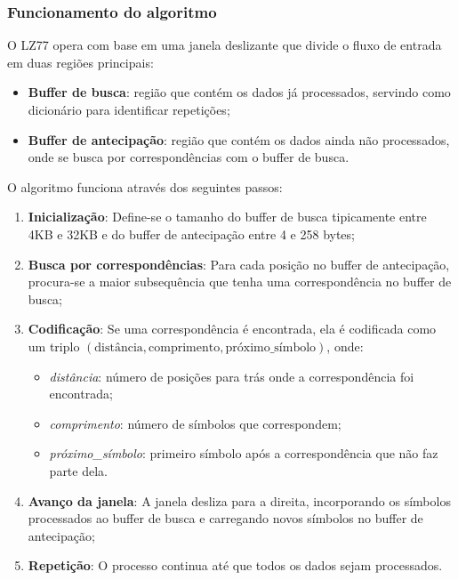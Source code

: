 \subsubsection{Funcionamento do algoritmo}

O LZ77 opera com base em uma janela deslizante que divide o fluxo de entrada em duas regiões principais:

\begin{itemize}
    \item \textbf{Buffer de busca}: região que contém os dados já processados, servindo como dicionário para identificar repetições;
    \item \textbf{Buffer de antecipação}: região que contém os dados ainda não processados, onde se busca por correspondências com o buffer de busca.
\end{itemize}

O algoritmo funciona através dos seguintes passos:

\begin{enumerate}
    \item \textbf{Inicialização}: Define-se o tamanho do buffer de busca tipicamente entre 4KB e 32KB e do buffer de antecipação entre 4 e 258 bytes;
    
    \item \textbf{Busca por correspondências}: Para cada posição no buffer de antecipação, procura-se a maior subsequência que tenha uma correspondência no buffer de busca;
    
    \item \textbf{Codificação}: Se uma correspondência é encontrada, ela é codificada como um triplo $(\text{distância}, \text{comprimento}, \text{próximo\_símbolo})$, onde:
    \begin{itemize}
        \item \textit{distância}: número de posições para trás onde a correspondência foi encontrada;
        \item \textit{comprimento}: número de símbolos que correspondem;
        \item \textit{próximo\_símbolo}: primeiro símbolo após a correspondência que não faz parte dela.
    \end{itemize}
    
    \item \textbf{Avanço da janela}: A janela desliza para a direita, incorporando os símbolos processados ao buffer de busca e carregando novos símbolos no buffer de antecipação;
    
    \item \textbf{Repetição}: O processo continua até que todos os dados sejam processados.
\end{enumerate}

